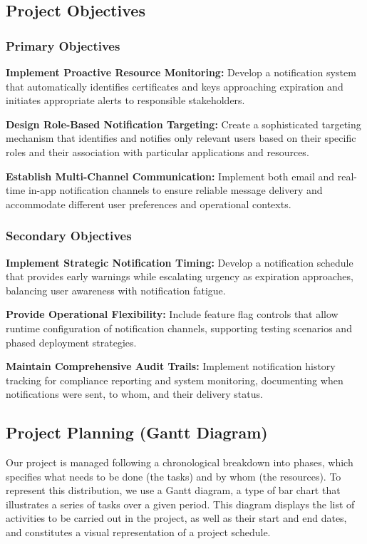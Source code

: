 \subsection{Project Objectives}

\subsubsection{Primary Objectives}

\textbf{Implement Proactive Resource Monitoring:} Develop a notification system that automatically identifies certificates and keys approaching expiration and initiates appropriate alerts to responsible stakeholders.

\noindent
\textbf{Design Role-Based Notification Targeting:} Create a sophisticated targeting mechanism that identifies and notifies only relevant users based on their specific roles and their association with particular applications and resources.

\noindent
\textbf{Establish Multi-Channel Communication:} Implement both email and real-time in-app notification channels to ensure reliable message delivery and accommodate different user preferences and operational contexts.

\subsubsection{Secondary Objectives}

\textbf{Implement Strategic Notification Timing:} Develop a notification schedule that provides early warnings while escalating urgency as expiration approaches, balancing user awareness with notification fatigue.

\noindent
\textbf{Provide Operational Flexibility:} Include feature flag controls that allow runtime configuration of notification channels, supporting testing scenarios and phased deployment strategies.

\noindent
\textbf{Maintain Comprehensive Audit Trails:} Implement notification history tracking for compliance reporting and system monitoring, documenting when notifications were sent, to whom, and their delivery status.

\newpage
\subsection{Project Planning (Gantt Diagram)}

Our project is managed following a chronological breakdown into phases, which specifies what needs to be done (the tasks) and by whom (the resources). To represent this distribution, we use a Gantt diagram, a type of bar chart that illustrates a series of tasks over a given period. This diagram displays the list of activities to be carried out in the project, as well as their start and end dates, and constitutes a visual representation of a project schedule.

